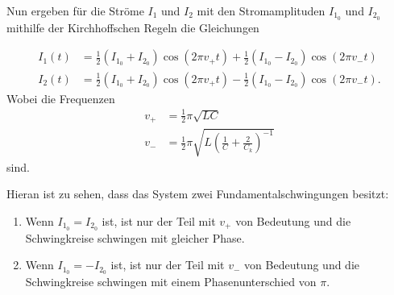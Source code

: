 Nun ergeben für die Ströme $I_1$ und $I_2$ mit den Stromamplituden $I_{1_0}$ und $I_{2_0}$ mithilfe der Kirchhoffschen Regeln die Gleichungen

\begin{align}
    \label{eq:strom}
    I_1(t) &= \frac{1}{2} (I_{1_0} + I_{2_0})\cos(2 \pi v_+ t) + \frac{1}{2} (I_{1_0} - I_{2_0})\cos(2 \pi v_- t) \\
    I_2(t) &= \frac{1}{2} (I_{1_0} + I_{2_0})\cos(2 \pi v_+ t) - \frac{1}{2} (I_{1_0} - I_{2_0})\cos(2 \pi v_- t).
\end{align}
Wobei die Frequenzen
\begin{align}
    \label{eq:frequenzen}
    v_+ &= \frac{1}{2} \pi \sqrt{L C} \\
    v_- &= \frac{1}{2} \pi \sqrt{L \left( \frac{1}{C} + \frac{2}{C_k} \right)^{-1}}
\end{align}
sind.\cite{V355}

Hieran ist zu sehen, dass das System zwei Fundamentalschwingungen besitzt:
\begin{enumerate}
\item Wenn $I_{1_0} = I_{2_0}$ ist, ist nur der Teil mit $v_+$ von Bedeutung und die Schwingkreise schwingen mit gleicher Phase.
\item Wenn $I_{1_0} = - I_{2_0}$ ist, ist nur der Teil mit $v_-$ von Bedeutung und die Schwingkreise schwingen mit einem Phasenunterschied von $\pi$.
\end{enumerate}

